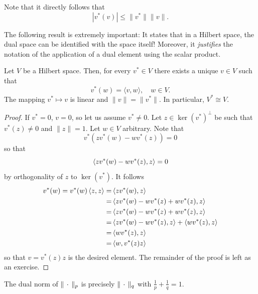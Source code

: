 Note that it directly follows that 
\begin{equation}
    |v^*(v)|\leq \|v^*\| \|v\|.
\end{equation}

The following result is extremely important: It states that in a Hilbert space, the dual space can be identified with the space itself! Moreover, it \emph{justifies} the notation of the application of a dual element using the scalar product.

\begin{theorem}[Riesz]
    Let $V$ be a Hilbert space. Then, for every $v^*\in V$ there exists a unique $v\in V$ such that
    \begin{equation}
        v^*(w) = \langle v,w\rangle,\quad w\in V.
    \end{equation}
    The mapping $v^*\mapsto v$ is linear and $\|v\| = \|v^*\|$.
    In particular, $V^*\cong V$. 
\end{theorem}
\begin{proof}
    If $v^*= 0$, $v=0$, so let us assume $v^*\neq 0$. Let $z\in \ker(v^*)^\perp$ be such that $v^*(z)\neq 0$ and $\|z\|=1$. 
    Let $w\in V$ arbitrary. Note that 
    \begin{equation}
        v^*(zv^*(w) - wv^*(z)) = 0
    \end{equation}
    so that 
    \begin{equation}
        \left\langle zv^*(w) - wv^*(z) , z\right\rangle = 0
    \end{equation}
    by orthogonality of $z$ to $\ker(v^*)$. It follows
    \begin{equation}
        \begin{aligned}
            v^*(w) = v^*(w)\left\langle z , z\right\rangle
            =& \left\langle zv^*(w) , z\right\rangle\\
            =& \left\langle zv^*(w) - wv^*(z) + wv^*(z) , z\right\rangle\\
            =& \left\langle zv^*(w) - wv^*(z) + wv^*(z) , z\right\rangle\\
            =& \left\langle zv^*(w) - wv^*(z) , z\right\rangle + \left\langle wv^*(z) , z\right\rangle\\
            =& \left\langle wv^*(z) , z\right\rangle\\
            =& \left\langle w , v^*(z)z\right\rangle
        \end{aligned}
    \end{equation}
    so that $v = v^*(z)z$ is the desired element. The remainder of the proof is left as an exercise.
\end{proof}

\begin{example}[Dual]
    The dual norm of $\|\,\cdot\,\|_p$ is precisely $\|\,\cdot\,\|_q$ with $\frac{1}{p}+\frac{1}{q}=1$.
\end{example}

